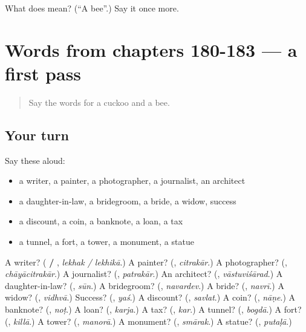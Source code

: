 \begin{tcolorbox}[breakable,colback=teal!4,colframe=teal!35!black,title={Before you move on}]
What does  mean? (\textquotedblleft{}A bee\textquotedblright{}.) Say it once more.
\end{tcolorbox}
\section[(dialogue)]{Words from chapters 180-183 — a first pass}

\label{lesson:MR-R188-first-pass-words-from-chapters-180-183}



\begin{quote}
Say the words for a cuckoo and a bee.
\end{quote}

\subsection*{Your turn}
Say these aloud:

\begin{itemize}
\raggedright
  \item a writer, a painter, a photographer, a journalist, an architect
  \item a daughter-in-law, a bridegroom, a bride, a widow, success
  \item a discount, a coin, a banknote, a loan, a tax
  \item a tunnel, a fort, a tower, a monument, a statue
\end{itemize}

\begin{tcolorbox}[breakable,colback=teal!4,colframe=teal!35!black,title={Before you move on}]
A writer? (\textbf{ / }, \emph{lekhak / lekhikā}.) A painter? (\textbf{}, \emph{citrakār}.) A photographer? (\textbf{}, \emph{chāyācitrakār}.) A journalist? (\textbf{}, \emph{patrakār}.) An architect? (\textbf{}, \emph{vāstuviśārad}.) A daughter-in-law? (\textbf{}, \emph{sūn}.) A bridegroom? (\textbf{}, \emph{navardev}.) A bride? (\textbf{}, \emph{navrī}.) A widow? (\textbf{}, \emph{vidhvā}.) Success? (\textbf{}, \emph{yaś}.) A discount? (\textbf{}, \emph{savlat}.) A coin? (\textbf{}, \emph{nāṇe}.) A banknote? (\textbf{}, \emph{noṭ}.) A loan? (\textbf{}, \emph{karja}.) A tax? (\textbf{}, \emph{kar}.) A tunnel? (\textbf{}, \emph{bogdā}.) A fort? (\textbf{}, \emph{killā}.) A tower? (\textbf{}, \emph{manorā}.) A monument? (\textbf{}, \emph{smārak}.) A statue? (\textbf{}, \emph{putaḷā}.)
\end{tcolorbox}
